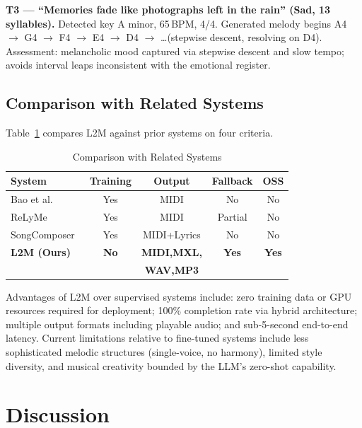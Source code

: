 \documentclass[conference]{IEEEtran}
\begin{document}
\textbf{T3 --- ``Memories fade like photographs left in the rain''
(Sad, 13 syllables).}
Detected key A minor, 65\,BPM, 4/4. Generated melody begins
A4 $\to$ G4 $\to$ F4 $\to$ E4 $\to$ D4 $\to$ \ldots (stepwise descent,
resolving on D4). Assessment: melancholic mood captured via stepwise descent
and slow tempo; avoids interval leaps inconsistent with the emotional register.

\subsection{Comparison with Related Systems}

Table~\ref{tab:comparison} compares L2M against prior systems on four
criteria.

\begin{table}[htbp]
\caption{Comparison with Related Systems}
\label{tab:comparison}
\centering
\begin{tabular}{@{}lcccc@{}}
\toprule
\textbf{System} & \textbf{Training} & \textbf{Output} & \textbf{Fallback} & \textbf{OSS} \\
\midrule
Bao et al.~\cite{bao2018}           & Yes & MIDI          & No      & No \\
ReLyMe~\cite{zhang2022relyme}        & Yes & MIDI          & Partial & No \\
SongComposer~\cite{ding2024songcomposer} & Yes & MIDI+Lyrics & No   & No \\
\textbf{L2M (Ours)} & \textbf{No} & \textbf{MIDI,MXL,} & \textbf{Yes} & \textbf{Yes} \\
                    &             & \textbf{WAV,MP3}   &              &              \\
\bottomrule
\end{tabular}
\end{table}

Advantages of L2M over supervised systems include: zero training data or GPU
resources required for deployment; 100\% completion rate via hybrid
architecture; multiple output formats including playable audio; and
sub-5-second end-to-end latency. Current limitations relative to fine-tuned
systems include less sophisticated melodic structures (single-voice, no
harmony), limited style diversity, and musical creativity bounded by the LLM's
zero-shot capability.

\section{Discussion}
\end{document}
